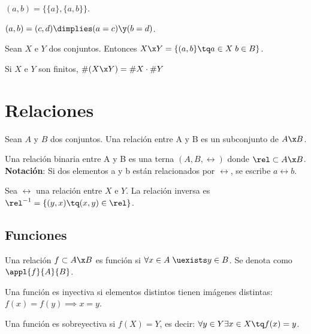 \documentclass[nochap]{apuntes}
\begin{document}
\begin{defn}
$(a, b)=\{\{a\},\{a,b\}\}$. 
\end{defn}
\begin{lemma}
$(a,b)=(c,d) \dimplies (a=c) \y (b=d)$.
\end{lemma}

\begin{defn}
Sean $X$ e $Y$ dos conjuntos. Entonces $X\x Y=\{(a,b\}\tq a\in X\; b\in B\}$.

Si $X$ e $Y$ son finitos, $\#(X\x Y) =\#X \cdot \#Y$
\end{defn}

\section{Relaciones}

\begin{defn}[Relación]
Sean $A$ y $B$ dos conjuntos. Una relación entre A y B es un subconjunto de $A\x B$.

\noindent Una relación binaria entre A y B es una terna $(A, B, \rel)$ donde $\rel \subset A\x B$. \\

\noindent \textbf{Notación}: Si dos elementos a y b están relacionados por $\rel$, se escribe $a\rel b$.
\end{defn}

\begin{defn}
Sea $\rel$ una relación entre $X$ e $Y$. La relación inversa es $\rel^{-1}=\{(y,x) \tq (x,y) \in \rel\}$.
\end{defn}

\subsection{Funciones}

\begin{defn}[Función]
Una relación $f\subset A\x B$ es función si $\forall x \in A \; \uexists y \in B $. Se denota como $\appl{f}{A}{B}$.
\end{defn}

\begin{defn} Una función \stdf es inyectiva si elementos distintos tienen imágenes distintas: $f(x)=f(y) \implies x=y$.
\end{defn}

\begin{defn}
Una función \stdf es sobreyectiva si $f(X)=Y$, es decir: $\forall y \in Y \exists x \in X \tq f(x)=y$.\end{defn}
\end{document}
